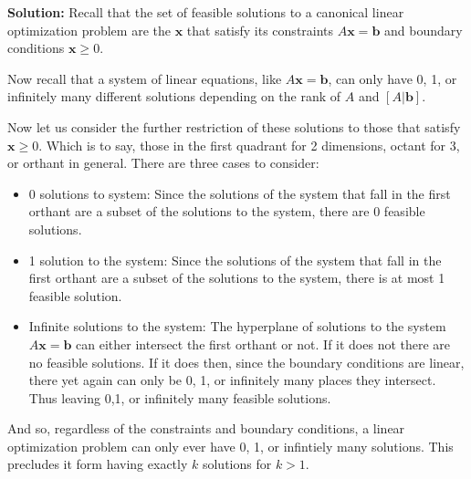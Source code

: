 \documentclass{article}
\renewcommand\vec{\mathbf}
\begin{document}
\noindent\textbf{Solution:} Recall that the set of feasible solutions to a canonical linear optimization problem are the $\vec x$ that satisfy its constraints $A\vec x=\vec b$ and boundary conditions $\vec x\ge 0$.

Now recall that a system of linear equations, like $A\vec x=\vec b$, can only have 0, 1, or infinitely many different solutions depending on the rank of $A$ and $[A|\vec b]$.

Now let us consider the further restriction of these solutions to those that satisfy $\vec x\ge 0$. Which is to say, those in the first quadrant for 2 dimensions, octant for 3, or orthant in general. There are three cases to consider:
\begin{itemize}
    \item 0 solutions to system: Since the solutions of the system that fall in the first orthant are a subset of the solutions to the system, there are 0 feasible solutions.
    \item 1 solution to the system: Since the solutions of the system  that fall in the first orthant are a subset of the solutions to the system, there is at most 1 feasible solution.
    \item Infinite solutions to the system: The hyperplane of solutions to the system $A\vec x=\vec b$ can either intersect the first orthant or not. If it does not there are no feasible solutions. If it does then, since the boundary conditions are linear, there yet again can only be 0, 1, or infinitely many places they intersect. Thus leaving 0,1, or infinitely many feasible solutions.
\end{itemize}

And so, regardless of the constraints and boundary conditions, a linear optimization problem can only ever have 0, 1, or infintiely many solutions. This precludes it form having exactly $k$ solutions for $k>1$.
\end{document}
